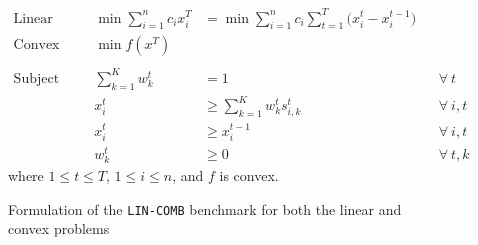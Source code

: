 \begin{figure}[ht]
	\begin{mdframed}
		\begin{align*}
			\text{Linear objective:} && \min \sum_{i=1}^{n} c_{i} x_{i}^{T} &= \min \sum_{i=1}^{n} c_{i} \sum_{t=1}^{T}\bigl( x_{i}^{t} - x_{i}^{t-1}\bigr)\\
			\text{Convex objective:} && \min f(x^{T}) &\\
		&& & \\
		\text{Subject to (both cases):} &&
			\sum_{k=1}^{K} w_{k}^{t} &= 1  && \forall\ t \\
			&& x_{i}^{t} &\geq \sum_{k=1}^{K} w_{k}^{t} s_{i,k}^{t} && \forall\ i, t\\
			&& x_{i}^{t} &\geq x_{i}^{t-1} && \forall\ i, t\\
			&& w_{k}^{t} &\geq 0  && \forall\ t, k
		\end{align*}
		where $1 \leq t \leq T$, $1 \leq i \leq n$, and $f$ is convex.
		\vspace{5pt}
	\end{mdframed}
	\caption{Formulation of the \texttt{LIN-COMB} benchmark for both the linear and convex problems}
	\label{fig:benchmark}
	\end{figure}

